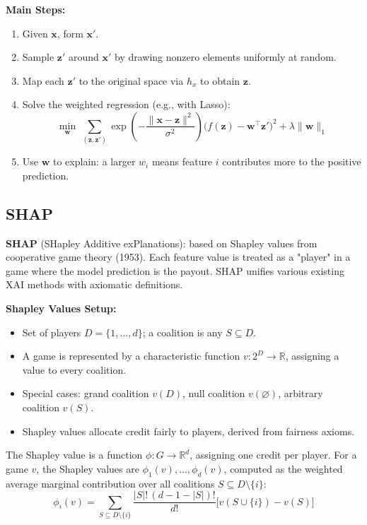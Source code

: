 \documentclass[UTF8]{ctexart}
\begin{document}
\textbf{Main Steps:}
\begin{enumerate}
    \item Given $\mathbf{x}$, form $\mathbf{x}'$.
    \item Sample $\mathbf{z}'$ around $\mathbf{x}'$ by drawing nonzero elements uniformly at random.
    \item Map each $\mathbf{z}'$ to the original space via $h_x$ to obtain $\mathbf{z}$.
    \item Solve the weighted regression (e.g., with Lasso):
    \[
        \min_{\mathbf{w}}\ \sum_{(\mathbf{z},\mathbf{z}')} \exp\!\left(-\frac{\|\mathbf{x}-\mathbf{z}\|^2}{\sigma^2}\right)\bigl(f(\mathbf{z}) - \mathbf{w}^\top \mathbf{z}'\bigr)^2 + \lambda\|\mathbf{w}\|_1
    \]
    \item Use $\mathbf{w}$ to explain: a larger $w_i$ means feature $i$ contributes more to the positive prediction.
\end{enumerate}

\subsection{SHAP}

\textbf{SHAP} (SHapley Additive exPlanations): based on Shapley values from cooperative game theory (1953). Each feature value is treated as a "player" in a game where the model prediction is the payout. SHAP unifies various existing XAI methods with axiomatic definitions.

\textbf{Shapley Values Setup:}
\begin{itemize}
    \item Set of players $D = \{1, \ldots, d\}$; a coalition is any $S \subseteq D$.
    \item A game is represented by a characteristic function $v: 2^D \to \mathbb{R}$, assigning a value to every coalition.
    \item Special cases: grand coalition $v(D)$, null coalition $v(\varnothing)$, arbitrary coalition $v(S)$.
    \item Shapley values allocate credit fairly to players, derived from fairness axioms.
\end{itemize}

The Shapley value is a function $\phi: G \to \mathbb{R}^d$, assigning one credit per player. For a game $v$, the Shapley values are $\phi_1(v), \ldots, \phi_d(v)$, computed as the weighted average marginal contribution over all coalitions $S \subseteq D \setminus \{i\}$:
\[
    \phi_i(v) = \sum_{S \subseteq D \setminus \{i\}} \frac{|S|!\,(d-1-|S|)!}{d!}\bigl[v(S \cup \{i\}) - v(S)\bigr]
\]
\end{document}
